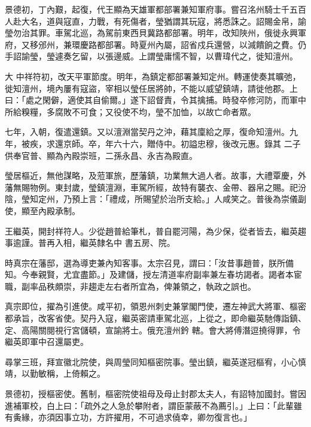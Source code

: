 \begin{pinyinscope}
 景德初，丁內艱，起復，代王顯為天雄軍都部署兼知軍府事。嘗召洺州騎士千五百人赴大名，道與寇直，力戰，有死傷者，瑩猶謂其玩寇，將悉誅之。詔賜金帛，諭瑩勿治其罪。車駕北巡，為駕前東西貝冀路都部署。明年，改知陜州，俄徙永興軍府，又移邠州，兼環慶路都部署。時夏州內屬，詔省戍兵還營，以減饋餉之費。仍手詔諭瑩，瑩遽奏乞留，以張邊威。上謂瑩庸懦不智，以曹瑋代之，徙知澶州。



 大
 中祥符初，改天平軍節度。明年，為鎮定都部署兼知定州。轉運使奏其曠弛，徙知澶州，境內屢有寇盜，宰相以瑩任居將帥，不能以威望鎮靖，請徙他郡。上曰：「處之閑僻，適使其自偷爾。」遂下詔督責，令其擒捕。時發卒修河防，而軍中所給糗糧，多腐敗不可食；又役使不均，瑩不加恤，以故亡命者眾。



 七年，入朝，復遣還鎮。又以澶淵當契丹之沖，藉其廩給之厚，復命知澶州。九年，被疾，求還京師。卒，年六十六，贈侍中。初謚忠穆，後改元惠。錄其
 二子供奉官普、顯為內殿崇班，二孫永昌、永吉為殿直。



 瑩居樞近，無他謀略，及蒞軍旅，歷藩鎮，功業無大過人者。故事，大禮覃慶，外藩無賜物例。東封歲，瑩鎮澶淵，車駕所經，故特有襲衣、金帶、器帛之賜。祀汾陰，瑩知定州，乃預上言：「禮成，所賜望於治所支給。」人咸笑之。普後為崇儀副使，顯至內殿承制。



 王繼英，開封祥符人。少從趙普給筆札，普自罷河陽，為少保，從者皆去，繼英趨事逾謹。普再入相，繼英隸名中
 書五房、院。



 時真宗在藩邸，選為導吏兼內知客事。太宗召見，謂曰：「汝昔事趙普，朕所備知。今奉親賢，尤宜盡節。」及建儲，授左清道率府副率兼左春坊謁者。謁者本宦職，副率品秩頗崇，非趨走左右者所宜為，俾兼領之，執政之誤也。



 真宗即位，擢為引進使。咸平初，領恩州刺史兼掌閣門使，遷左神武大將軍、樞密都承旨，改客省使。契丹入寇，繼英密請車駕北巡，上從之，即命繼英馳傳詣鎮、定、高陽關閱視行宮儲頓，宣諭將士。俄充澶州鈐
 轄。會大將傅潛逗撓得罪，令繼英即軍中召還屬吏。



 尋掌三班，拜宣徽北院使，與周瑩同知樞密院事。瑩出鎮，繼英遂冠樞宥，小心慎靖，以勤敏稱，上倚賴之。



 景德初，授樞密使。舊制，樞密院使祖母及母止封郡太夫人，有詔特加國封。嘗因進補軍校，白上曰：「疏外之人急於攀附者，謂臣蒙蔽不為薦引。」上曰：「此輩雖有夤緣，亦須因事立功，方許擢用，不可過求僥幸，卿勿復言也。」




\end{pinyinscope}
